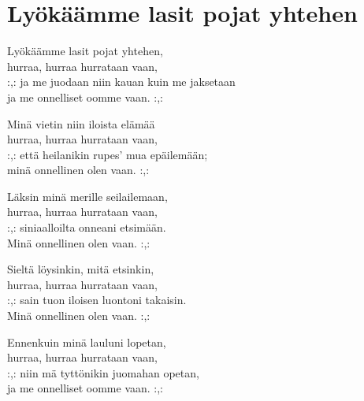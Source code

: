 \section{Lyökäämme lasit pojat yhtehen}

Lyökäämme lasit pojat yhtehen, \\
hurraa, hurraa hurrataan vaan, \\
:,: ja me juodaan niin kauan kuin me jaksetaan \\
ja me onnelliset oomme vaan. :,:

Minä vietin niin iloista elämää \\
hurraa, hurraa hurrataan vaan, \\
:,: että heilanikin rupes’ mua epäilemään; \\
minä onnellinen olen vaan. :,:

Läksin minä merille seilailemaan, \\
hurraa, hurraa hurrataan vaan, \\
:,: siniaalloilta onneani etsimään. \\
Minä onnellinen olen vaan. :,:

Sieltä löysinkin, mitä etsinkin, \\
hurraa, hurraa hurrataan vaan, \\
:,: sain tuon iloisen luontoni takaisin. \\
Minä onnellinen olen vaan. :,:

Ennenkuin minä lauluni lopetan, \\
hurraa, hurraa hurrataan vaan, \\
:,: niin mä tyttönikin juomahan opetan, \\
ja me onnelliset oomme vaan. :,: